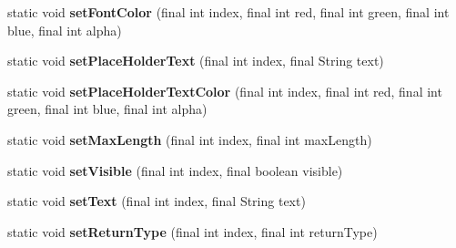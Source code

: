 \begin{DoxyCompactItemize}
\item 
\mbox{\label{classorg_1_1cocos2dx_1_1lib_1_1Cocos2dxEditBoxHelper_a54f094d165cadb985dae4279a12d85ee}} 
static void {\bfseries set\+Font\+Color} (final int index, final int red, final int green, final int blue, final int alpha)
\item 
\mbox{\label{classorg_1_1cocos2dx_1_1lib_1_1Cocos2dxEditBoxHelper_ac65184cb564186b748253db5e37b913d}} 
static void {\bfseries set\+Place\+Holder\+Text} (final int index, final String text)
\item 
\mbox{\label{classorg_1_1cocos2dx_1_1lib_1_1Cocos2dxEditBoxHelper_a4549c434143b42ced9989141d81e8531}} 
static void {\bfseries set\+Place\+Holder\+Text\+Color} (final int index, final int red, final int green, final int blue, final int alpha)
\item 
\mbox{\label{classorg_1_1cocos2dx_1_1lib_1_1Cocos2dxEditBoxHelper_a4c7a16d4be910e4d10e5797f42788924}} 
static void {\bfseries set\+Max\+Length} (final int index, final int max\+Length)
\item 
\mbox{\label{classorg_1_1cocos2dx_1_1lib_1_1Cocos2dxEditBoxHelper_a475bf838ea1873c7a6dc071fb6311898}} 
static void {\bfseries set\+Visible} (final int index, final boolean visible)
\item 
\mbox{\label{classorg_1_1cocos2dx_1_1lib_1_1Cocos2dxEditBoxHelper_a3505dfac4fbd23a4661a5cb800370b10}} 
static void {\bfseries set\+Text} (final int index, final String text)
\item 
\mbox{\label{classorg_1_1cocos2dx_1_1lib_1_1Cocos2dxEditBoxHelper_abece66af5e9d56e0cf8cdfc6f4510738}} 
static void {\bfseries set\+Return\+Type} (final int index, final int return\+Type)
\item 
\mbox{\label{classorg_1_1cocos2dx_1_1lib_1_1Cocos2dxEditBoxHelper_ac647f712c52b3612087851ee03d1abff}} 

\end{DoxyCompactItemize}
